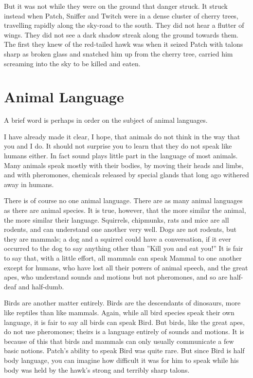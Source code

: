 \documentclass[12pt]{book}
\begin{document}
But it was not while they were on the ground that danger struck. It struck instead when Patch, Sniffer and Twitch were in a dense cluster of cherry trees, travelling rapidly along the sky-road to the south. They did not hear a flutter of wings. They did not see a dark shadow streak along the ground towards them. The first they knew of the red-tailed hawk was when it seized Patch with talons sharp as broken glass and snatched him up from the cherry tree, carried him screaming into the sky to be killed and eaten.


\section{Animal Language}

A brief word is perhaps in order on the subject of animal languages.

I have already made it clear, I hope, that animals do not think in the way that you and I do. It should not surprise you to learn that they do not speak like humans either. In fact sound plays little part in the language of most animals. Many animals speak mostly with their bodies, by moving their heads and limbs, and with pheromones, chemicals released by special glands that long ago withered away in humans.

There is of course no one animal language. There are as many animal languages as there are animal species. It is true, however, that the more similar the animal, the more similar their language. Squirrels, chipmunks, rats and mice are all rodents, and can understand one another very well. Dogs are not rodents, but they are mammals; a dog and a squirrel could have a conversation, if it ever occurred to the dog to say anything other than ''Kill you and eat you!'' It is fair to say that, with a little effort, all mammals can speak Mammal to one another %
except for humans, who have lost all their powers of animal speech, and the great apes, who understand sounds and motions but not pheromones, and so are half-deaf and half-dumb.

Birds are another matter entirely. Birds are the descendants of dinosaurs, more like reptiles than like mammals. Again, while all bird species speak their own language, it is fair to say all birds can speak Bird. But birds, like the great apes, do not use pheromones; theirs is a language entirely of sounds and motions. It is because of this that birds and mammals can only usually communicate a few basic notions. Patch's ability to speak Bird was quite rare. But since Bird is half body language, you can imagine how difficult it was for him to speak while his body was held by the hawk's strong and terribly sharp talons.
\end{document}
